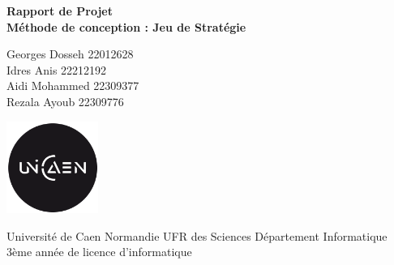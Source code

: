 \documentclass[12pt]{article}
\begin{document}
\begin{titlepage}
\begin{center}
\vspace*{0cm}
\Huge\bf{Rapport de Projet} \\
\vspace*{1cm}
\LARGE{Méthode de conception : Jeu de Stratégie}\\
\vspace*{0.5cm}


\end{center}
\vspace*{0.7cm}
\begin{center}
\Large{Georges Dosseh 22012628\\
Idres Anis 22212192\\
Aidi Mohammed 22309377\\
Rezala Ayoub 22309776\\}
\vspace*{2cm}

\end{center}
\vspace*{1cm}

\begin{center}
\begin{minipage}[t]{0.48\textwidth}
\centering
\vspace*{0cm}
\includegraphics[width=3cm,height=3cm]{images/unicaen.png}

\vspace*{0.25cm}
\large{Université de Caen Normandie}
\large{UFR des Sciences}
\large{Département Informatique}\\
\large{3ème année de licence d’informatique}


\end{minipage}
\hfill
\end{center}
\end{titlepage}



\newpage

\tableofcontents

\newpage

\end{document}
